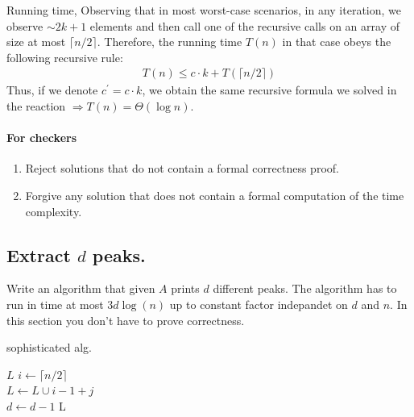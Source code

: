 Running time, Observing that in most worst-case scenarios, in any iteration, we observe $\sim 2k+1$ elements and then call one of the recursive calls on an array of size at most $\lceil n /2 \rceil$. Therefore, the running time $T(n)$ in that case obeys the following recursive rule:
\begin{equation*}
  \begin{split}
    T\left( n \right) \le c\cdot k + T\left( \lceil n / 2\rceil  \right)
  \end{split}
\end{equation*}
Thus, if we denote $c^{\prime}=c\cdot k$, we obtain the same recursive formula we solved in the reaction $\Rightarrow T\left( n \right) = \Theta\left( \log n \right)$.

\fi
\ifdefined\CHECK 
\paragraph{For checkers}
\begin{enumerate}
  \item Reject solutions that do not contain a formal correctness proof.
  \item Forgive any solution that does not contain a formal computation of the time complexity.
\end{enumerate}
\fi

\ifdefined\DPEAK

\subsection{Extract $d$ peaks.} Write an algorithm that given $A$ prints $d$ different peaks. The algorithm has to run in time at most $3d\log(n)$ up to constant factor indepandet on $d$ and $n$. In this section you don't have to prove correctness. 

\ifdefined\SOLUTION

 \begin{algorithm}
\caption{sophisticated alg.}
  \label{alg:count}
   {
    \Return  $L$
 }
$ i \leftarrow  \lceil n/2 \rceil $\\
         { 
           {
            $ L \leftarrow L \cup i -1 + j $  \\
             $d \leftarrow d -1$
           }
          } 
        \Return L     
\end{algorithm}

